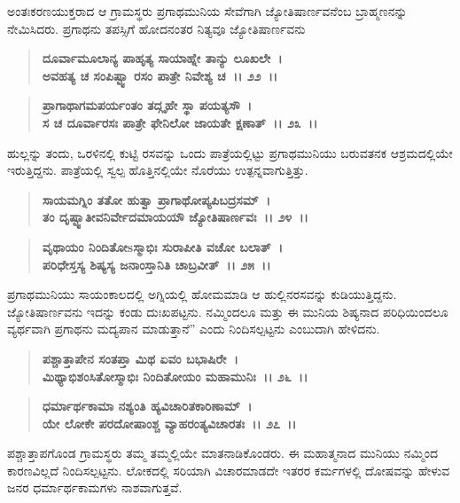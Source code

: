 ಅಂತಃಕರಣಯುಕ್ತರಾದ ಆ ಗ್ರಾಮಸ್ಥರು ಪ್ರಗಾಥಮುನಿಯ ಸೇವೆಗಾಗಿ ಜ್ಯೋತಿಷಾರ್ಣವನೆಂಬ ಬ್ರಾಹ್ಮಣನನ್ನು ನೇಮಿಸಿದರು. ಪ್ರಗಾಥನು ತಪಸ್ಸಿಗೆ ಹೋದನಂತರ ನಿತ್ಯವೂ ಜ್ಯೋತಿಷಾರ್ಣವನು

\begin{verse}
\textbf{ದೂರ್ವಾಮೂಲಾನ್ಯ ಪಾಹೃತ್ಯ ಸಾಯಾಹ್ನೇ ತಾನ್ಯು ಲೂಖಲೇ~।}\\\textbf{ಅವಹತ್ಯ ಚ ಸಂಪಿಷ್ಟ್ವಾ ರಸಂ ಪಾತ್ರೇ ನಿವೇಶ್ಯ ಚ~।। ೨೨~।।}
\end{verse}

\begin{verse}
\textbf{ಪ್ರಾಗಾಥಾಗಮಪರ್ಯಂತಂ ತದ್ಗೃಹೇ ಸ್ಥಾ ಪಯತ್ಯಸೌ~।}\\\textbf{ಸ ಚ ದೂರ್ವಾರಸಃ ಪಾತ್ರೇ ಫೇನಿಲೋ ಜಾಯತೇ ಕ್ಷಣಾತ್~।। ೨೩~।।}
\end{verse}

ಹುಲ್ಲನ್ನು ತಂದು, ಒರಳಿನಲ್ಲಿ ಕುಟ್ಟಿ ರಸವನ್ನು ಒಂದು ಪಾತ್ರೆಯಲ್ಲಿಟ್ಟು ಪ್ರಗಾಥಮುನಿಯು ಬರುವತನಕ ಆಶ್ರಮದಲ್ಲಿಯೇ ಇರುತ್ತಿದ್ದನು. ಪಾತ್ರೆಯಲ್ಲಿ ಸ್ವಲ್ಪ ಹೊತ್ತಿನಲ್ಲಿಯೇ ನೊರೆಯು ಉತ್ಪನ್ನವಾಗುತ್ತಿತ್ತು.

\begin{verse}
\textbf{ಸಾಯಮಗ್ನಿಂ ತತೋ ಹುತ್ವಾ ಪ್ರಾಗಾಥೋಪ್ಯಪಿಬದ್ರಸಮ್~।}\\\textbf{ತಂ ದೃಷ್ಟ್ವಾತೀವನಿರ್ವೇದಮಾಯಯೌ ಜ್ಯೋತಿಷಾರ್ಣವಃ~।। ೨೪~।। }
\end{verse}

\begin{verse}
\textbf{ವೃಥಾಯಂ ನಿಂದಿತೋsಸ್ಮಾಭಿಃ ಸುರಾಪೀತಿ ವಚೋ ಬಲಾತ್~।}\\\textbf{ಪರಿಧೇಸ್ತಸ್ಯ ಶಿಷ್ಯಸ್ಯ ಜನಾಂಸ್ತಾನಿತಿ ಚಾಬ್ರವೀತ್~।। ೨೫~।।}
\end{verse}

ಪ್ರಗಾಥಮುನಿಯು ಸಾಯಂಕಾಲದಲ್ಲಿ ಅಗ್ನಿಯಲ್ಲಿ ಹೋಮಮಾಡಿ ಆ ಹುಲ್ಲಿನರಸವನ್ನು ಕುಡಿಯುತ್ತಿದ್ದನು. ಜ್ಯೋತಿಷಾರ್ಣವನು ಇದನ್ನು ಕಂಡು ದುಃಖಪಟ್ಟನು. ನಮ್ಮಿಂದಲೂ ಮತ್ತು ಈ ಮುನಿಯ ಶಿಷ್ಯನಾದ ಪರಿಧಿಯಿಂದಲೂ ವ್ಯರ್ಥವಾಗಿ ಪ್ರಗಾಥನು ಮದ್ಯಪಾನ ಮಾಡುತ್ತಾನೆ” ಎಂದು ನಿಂದಿಸಲ್ಪಟ್ಟನು ಎಂಬುದಾಗಿ ಹೇಳಿದನು.

\begin{verse}
\textbf{ಪಶ್ಚಾತ್ತಾಪೇನ ಸಂತಪ್ತಾ ಮಿಥ ಏವಂ ಬಭಾಷಿರೇ~।}\\\textbf{ಮಿಥ್ಯಾಭಿಶಂಸಿತೋಸ್ಮಾಭಿಃ ನಿಂದಿತೋಯಂ ಮಹಾಮುನಿಃ~।। ೨೬~।।} 
\end{verse}

\begin{verse}
\textbf{ಧರ್ಮಾರ್ಥಕಾಮಾ ನಶ್ಯಂತಿ ಹ್ಯವಿಚಾರಿತಕಾರಿಣಾಮ್~।}\\\textbf{ಯೇ ಲೋಕೇ ಪರದೋಷಾಂಶ್ಚ ವ್ಯಾಹರಂತ್ಯವಿಚಾರತಃ~।। ೨೭~।।}
\end{verse}

ಪಶ್ಚಾತ್ತಾಪಗೊಂಡ ಗ್ರಾಮಸ್ಥರು ತಮ್ಮ ತಮ್ಮಲ್ಲಿಯೇ ಮಾತನಾಡಿಕೊಂಡರು. ಈ ಮಹಾತ್ಮನಾದ ಮುನಿಯು ನಮ್ಮಿಂದ ಕಾರಣವಿಲ್ಲದೆ ನಿಂದಿಸಲ್ಪಟ್ಟನು. ಲೋಕದಲ್ಲಿ ಸರಿಯಾಗಿ ವಿಚಾರಮಾಡದೇ ಇತರರ ಕರ್ಮಗಳಲ್ಲಿ ದೋಷವನ್ನು ಹೇಳುವ ಜನರ ಧರ್ಮಾರ್ಥಕಾಮಗಳು ನಾಶವಾಗುತ್ತವೆ.

